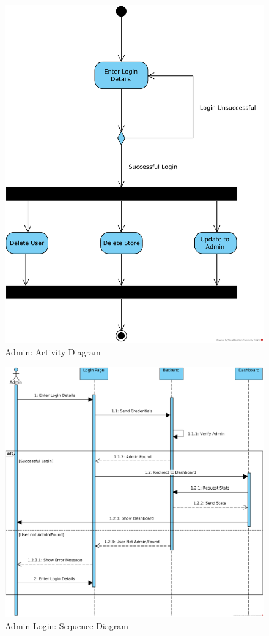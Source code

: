 \begin{figure}[H]
    \centering
    \includegraphics[]{media/Activity/Admin.png}
	\caption{Admin: Activity Diagram}
	\label{fig:Admin_Activity}
\end{figure}



\begin{figure}[H]
    \centering
    \includegraphics[width = \linewidth]{media/Sequence/Admin_Login.png}
	\caption{Admin Login: Sequence Diagram}
	\label{fig:Admin_Login}
\end{figure}


